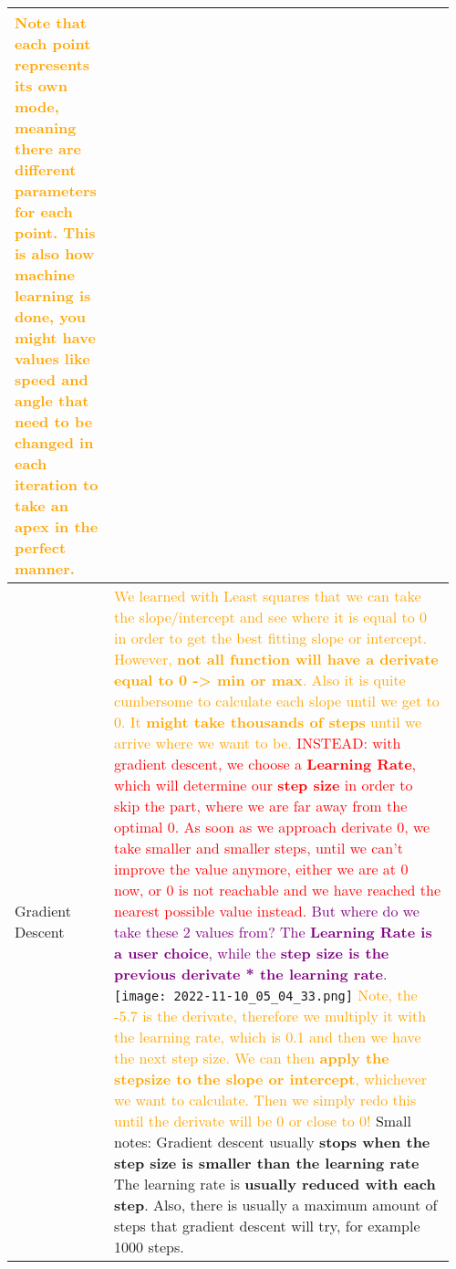 \documentclass[main.tex,fontsize=8pt,paper=a4,paper=portrait,DIV=calc,]{scrartcl}
\begin{document}
\begin{table}[ht!]
\begin{tabular}{|m{0.2\linewidth}|m{0.755\linewidth}|}
\textcolor{orange}{Note that each point represents its own mode, meaning there are different parameters for each point.\newline
This is also how machine learning is done, you might have values like speed and angle that need to be changed in each iteration to take an apex in the perfect manner.}\\
\hline
Gradient Descent & 
\textcolor{orange}{We learned with Least squares that we can take the slope/intercept and see where it is equal to 0 in order to get the best fitting slope or intercept. \newline
However, \textbf{not all function will have a derivate equal to 0 -> min or max}. Also it is quite cumbersome to calculate each slope until we get to 0. It \textbf{might take thousands of steps} until we arrive where we want to be.}\newline
\textcolor{red}{INSTEAD: with gradient descent, we choose a \textbf{Learning Rate}, which will determine our \textbf{step size} in order to skip the part, where we are far away from the optimal 0.\newline
As soon as we approach derivate 0, we take smaller and smaller steps, until we can't improve the value anymore, either we are at 0 now, or 0 is not reachable and we have reached the nearest possible value instead.}\newline
\textcolor{purple}{But where do we take these 2 values from? The \textbf{Learning Rate is a user choice}, while the \textbf{step size is the previous derivate * the learning rate}.}\newline
\texttt{[image: 2022-11-10\_05\_04\_33.png]}\newline
\textcolor{orange}{Note, the -5.7 is the derivate, therefore we multiply it with the learning rate, which is 0.1 and then we have the next step size.\newline
We can then \textbf{apply the stepsize to the slope or intercept}, whichever we want to calculate.\newline
Then we simply redo this until the derivate will be 0 or close to 0!}\newline
Small notes: Gradient descent usually \textbf{stops when the step size is smaller than the learning rate}\newline
The learning rate is \textbf{usually reduced with each step}.\newline
Also, there is usually a maximum amount of steps that gradient descent will try, for example 1000 steps.\newline

\end{tabular}
\end{table}
\end{document}

